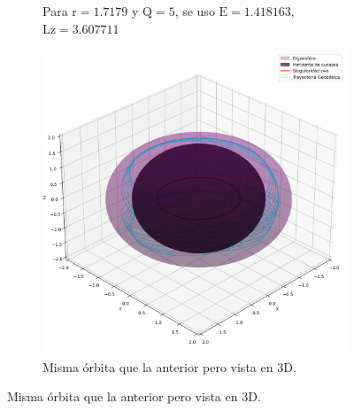 \begin{figure}[H]
\begin{subfigure}{0.5\textwidth}
        \caption{Para $\mathrm{r}=1.7179$ y $\mathrm{Q}=5$, se uso $\mathrm{E}=1.418163$, $\mathrm{Lz}=3.607711$}
    \end{subfigure}
    \begin{subfigure}{0.5\textwidth}
        \includegraphics[width=\linewidth]{AgujerosNegros/kerr/geodesics_plots/geodesica_circular_r1,71_Q5.png}
        \caption{Misma órbita que la anterior pero vista en 3D.}
    \end{subfigure}
    

\end{figure}
